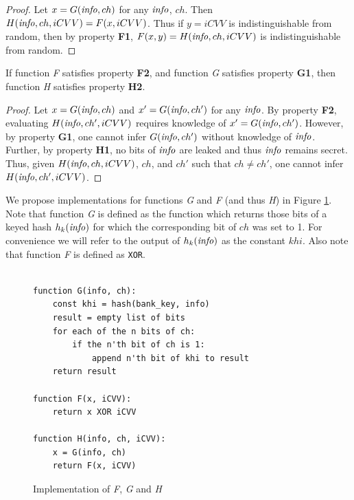 \begin{proof}
  Let $x = G(\textrm{\emph{info}}, ch)$ for any $\textrm{\emph{info}}$, $ch$.
  Then $H(\textrm{\emph{info}}, ch, iCVV) = F(x, iCVV)$.
  Thus if $y = iCVV$ is indistinguishable from random, then by property \textbf{F1}, $F(x,y) = H(\textrm{\emph{info}}, ch, iCVV)$ is indistinguishable from random.
\end{proof}


\begin{theorem}
If function \emph{F} satisfies property \textbf{F2}, and function \emph{G} satisfies property \textbf{G1}, then function \emph{H} satisfies property \textbf{H2}.
\end{theorem}

\begin{proof}
  Let $x = G(\textrm{\emph{info}}, ch)$ and $x' = G(\textrm{\emph{info}}, ch')$ for any $\textrm{\emph{info}}$.
  By property \textbf{F2}, evaluating $H(\textrm{\emph{info}}, ch', iCVV)$ requires knowledge of $x' = G(\textrm{\emph{info}}, ch')$.
  However, by property \textbf{G1}, one cannot infer $G(\textrm{\emph{info}}, ch')$ without knowledge of $\textrm{\emph{info}}$.
  Further, by property \textbf{H1}, no bits of $\textrm{\emph{info}}$ are leaked and thus $\textrm{\emph{info}}$ remains secret.
  Thus, given $H(\textrm{\emph{info}}, ch, iCVV)$, $ch$, and $ch'$ such that $ch \neq ch'$, one cannot infer $H(\textrm{\emph{info}}, ch', iCVV)$.
\end{proof}


We propose implementations for functions \emph{G} and \emph{F} (and thus \emph{H}) in Figure \ref{fig:implementation}.
Note that function \emph{G} is defined as the function which returns those bits of a keyed hash $h_k(\textrm{\emph{info}})$ for which the corresponding bit of $ch$ was set to 1.
For convenience we will refer to the output of $h_k(\textrm{\emph{info}})$ as the constant $khi$.
Also note that function \emph{F} is defined as \texttt{XOR}.



\begin{figure}[h!]
  \caption{Implementation of \emph{F}, \emph{G} and \emph{H}}
  \begin{verbatim}

function G(info, ch):
    const khi = hash(bank_key, info)
    result = empty list of bits
    for each of the n bits of ch:
        if the n'th bit of ch is 1:
            append n'th bit of khi to result
    return result

function F(x, iCVV):
    return x XOR iCVV

function H(info, ch, iCVV):
    x = G(info, ch)
    return F(x, iCVV)
\end{verbatim}
  \label{fig:implementation}
\end{figure}

